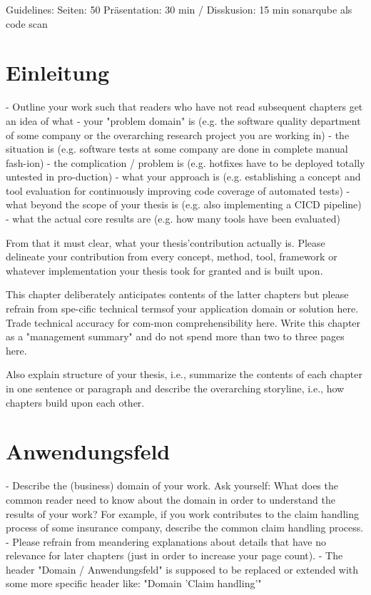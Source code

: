 Guidelines:
Seiten: 50
Präsentation: 30 min / Disskusion: 15 min
sonarqube als code scan

\section{Einleitung}

- Outline your work such that readers who have not read subsequent chapters get an idea of what
  - your "problem domain" is (e.g. the software quality department of some company or the overarching research project you are working in)
  - the situation is (e.g. software tests at some company are done in complete manual fash-ion)
  - the complication / problem is (e.g. hotfixes have to be deployed totally untested in pro-duction)
  - what your approach is (e.g. establishing a concept and tool evaluation for continuously improving code coverage of automated tests)
  - what beyond the scope of your thesis is (e.g. also implementing a CICD pipeline)
  - what the actual core results are (e.g. how many tools have been evaluated)

From that it must clear, what your thesis'contribution actually is. Please delineate your contribution from every concept, method, tool, framework or whatever implementation your thesis took for granted and is built upon.

This chapter deliberately anticipates contents of the latter chapters but please refrain from spe-cific technical termsof your application domain or solution here. Trade technical accuracy for com-mon comprehensibility here. Write this chapter as a "management summary" and do not spend more than two to three pages here.

Also explain structure of your thesis, i.e., summarize the contents of each chapter in one sentence or paragraph and describe the overarching storyline, i.e., how chapters build upon each other.

\section{Anwendungsfeld}

- Describe the (business) domain of your work. Ask yourself: What does the common reader need to know about the domain in order to understand the results of your work? For example, if you work contributes to the claim handling process of some insurance company, describe the common claim handling process.
- Please refrain from meandering explanations about details that have no relevance for later chapters (just in order to increase your page count).
- The header "Domain / Anwendungsfeld" is supposed to be replaced or extended with some more specific header like: "Domain 'Claim handling'"

